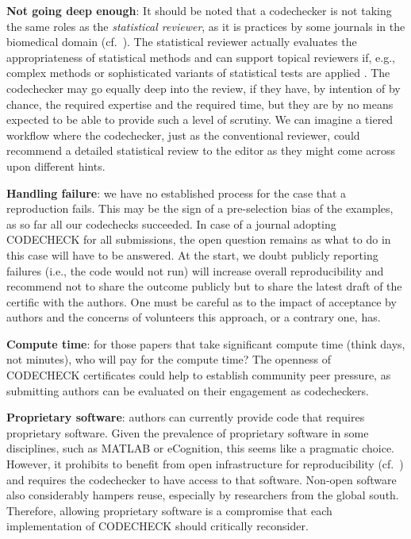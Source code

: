 \documentclass[12pt]{article}
\begin{document}
\textbf{Not going deep enough}: 
It should be noted that a codechecker is not taking the same roles as the
\emph{statistical reviewer}, as it is practices by some journals in the 
biomedical domain (cf.~\cite{petrovecki_role_2009,greenwood_how_2015}).
The statistical reviewer actually evaluates the appropriateness of
statistical methods \cite{greenwood_how_2015} and can support topical
reviewers if, e.g., complex methods or sophisticated variants of statistical
tests are applied \cite{petrovecki_role_2009}.
The codechecker may go equally deep into the review, if they have, by 
intention of by chance, the required expertise and the required time, 
but they are by no means expected to be able to provide
such a level of scrutiny. We can imagine a tiered workflow where the 
codechecker, just as the conventional reviewer, could recommend a detailed
statistical review to the editor as they might come across upon different
hints.

\textbf{Handling failure}: we have no established process for the case
that a reproduction fails. This may be the sign of a pre-selection bias
of the examples, as so far all our codechecks succeeded.
In case of a journal adopting CODECHECK for all submissions, the open 
question remains as what to do in this case will have to be answered.
At the start, we doubt publicly reporting failures (i.e., the code 
would not run) will increase overall reproducibility and recommend not
to share the outcome publicly but to share the latest draft of the 
certific with the authors.
One must be careful as to the impact of acceptance by authors and the
concerns of volunteers this approach, or a contrary one, has.

\textbf{Compute time}: for those papers that take significant compute
time (think days, not minutes), who will pay for the compute time?
The openness of CODECHECK certificates could help to establish community
peer pressure, as submitting authors can be evaluated on their engagement
as codecheckers.

\textbf{Proprietary software}: authors can currently provide code that requires
proprietary software. Given the prevalence of proprietary software in
some disciplines, such as MATLAB or eCognition,
this seems like a pragmatic choice.
However, it prohibits to benefit from open infrastructure for reproducibility
(cf.~\cite{konkol_publishing_2020}) and requires the codechecker to have access 
to that software.
Non-open software also considerably hampers reuse, especially by researchers
from the global south. Therefore, allowing proprietary software is a compromise
that each implementation of CODECHECK should critically reconsider.
\end{document}
